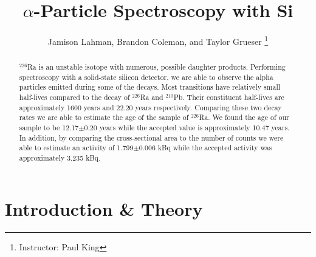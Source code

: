 \documentclass[10pt]{IEEEtran}
\begin{document}
    \title{$\alpha$-Particle Spectroscopy with Si}
    \author{Jamison Lahman, Brandon Coleman, and Taylor Grueser
    \thanks{Instructor: Paul King}}
    \maketitle

\begin{abstract}
$^{226}$Ra is an unstable isotope with numerous, possible daughter products. Performing spectroscopy with a solid-state silicon detector, we are able to observe the alpha particles emitted during some of the decays. Most transitions have relatively small half-lives compared to the decay of  $^{226}$Ra and $^{210}$Pb. Their constituent half-lives are approximately 1600 years and 22.20 years respectively. Comparing these two decay rates we are able to estimate the age of the sample of $^{226}$Ra. We found the age of our sample to be 12.17$\pm$0.20 years while the accepted value is approximately 10.47 years. In addition, by comparing the cross-sectional area to the number of counts we were able to estimate an activity of 1.799$\pm$0.006 kBq while the accepted activity was approximately 3.235 kBq.
\end{abstract}

\section{Introduction \& Theory}
\end{document}
